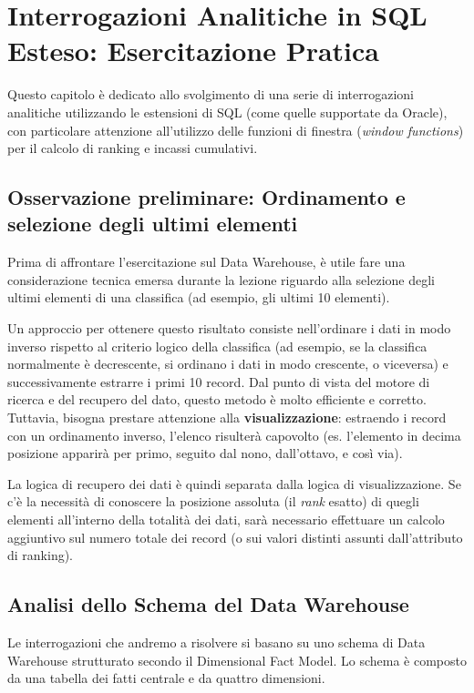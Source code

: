 \chapter{Interrogazioni Analitiche in SQL Esteso: Esercitazione Pratica}

Questo capitolo è dedicato allo svolgimento di una serie di interrogazioni analitiche utilizzando le estensioni di SQL (come quelle supportate da Oracle), con particolare attenzione all'utilizzo delle funzioni di finestra (\textit{window functions}) per il calcolo di ranking e incassi cumulativi.

\section{Osservazione preliminare: Ordinamento e selezione degli ultimi elementi}
Prima di affrontare l'esercitazione sul Data Warehouse, è utile fare una considerazione tecnica emersa durante la lezione riguardo alla selezione degli ultimi elementi di una classifica (ad esempio, gli ultimi 10 elementi). 

Un approccio per ottenere questo risultato consiste nell'ordinare i dati in modo inverso rispetto al criterio logico della classifica (ad esempio, se la classifica normalmente è decrescente, si ordinano i dati in modo crescente, o viceversa) e successivamente estrarre i primi 10 record. Dal punto di vista del motore di ricerca e del recupero del dato, questo metodo è molto efficiente e corretto. Tuttavia, bisogna prestare attenzione alla \textbf{visualizzazione}: estraendo i record con un ordinamento inverso, l'elenco risulterà capovolto (es. l'elemento in decima posizione apparirà per primo, seguito dal nono, dall'ottavo, e così via). 

La logica di recupero dei dati è quindi separata dalla logica di visualizzazione. Se c'è la necessità di conoscere la posizione assoluta (il \textit{rank} esatto) di quegli elementi all'interno della totalità dei dati, sarà necessario effettuare un calcolo aggiuntivo sul numero totale dei record (o sui valori distinti assunti dall'attributo di ranking).

\section{Analisi dello Schema del Data Warehouse}
Le interrogazioni che andremo a risolvere si basano su uno schema di Data Warehouse strutturato secondo il Dimensional Fact Model. Lo schema è composto da una tabella dei fatti centrale e da quattro dimensioni.

